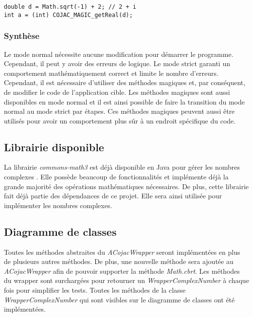 \begin{verbatim}
double d = Math.sqrt(-1) + 2; // 2 + i
int a = (int) COJAC_MAGIC_getReal(d);
\end{verbatim}

\subsubsection{Synthèse}

Le mode normal nécessite aucune modification pour démarrer le programme. Cependant, il peut y avoir des erreurs de logique. Le mode strict garanti un comportement mathématiquement correct et limite le nombre d'erreurs. Cependant, il est nécessaire d'utiliser des méthodes magiques et, par conséquent, de modifier le code de l'application cible. Les méthodes magiques sont aussi disponibles en mode normal et il est ainsi possible de faire la transition du mode normal au mode strict par étapes. Ces méthodes magiques peuvent aussi être utilisés pour avoir un comportement plus sûr à un endroit spécifique du code.

\subsection{Librairie disponible}

La librairie \textit{commons-math3} est déjà disponible en Java pour gérer les nombres complexes \cite{apache-complex-documentation}. Elle possède beaucoup de fonctionnalités et implémente déjà la grande majorité des opérations mathématiques nécessaires. De plus, cette librairie fait déjà partie des dépendances de ce projet. Elle sera ainsi utilisée pour implémenter les nombres complexes.

\subsection{Diagramme de classes}

Toutes les méthodes abstraites du \textit{ACojacWrapper} seront implémentées en plus de plusieurs autres méthodes. De plus, une nouvelle méthode sera ajoutée au \textit{ACojacWrapper} afin de pouvoir supporter la méthode \textit{Math.cbrt}. Les méthodes du wrapper sont surchargées pour retourner un \textit{WrapperComplexNumber} à chaque fois pour simplifier les tests. Toutes les méthodes de la classe \textit{WrapperComplexNumber} qui sont visibles sur le diagramme de classes ont été implémentées.

\begin{minipage}{\linewidth}
\label{fig:class_diagram}
\end{minipage}